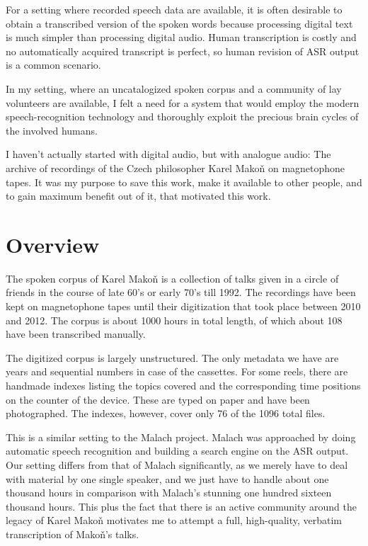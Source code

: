 \documentclass[12pt,a4paper]{report}
\begin{document}
For a setting where recorded speech data are available, it is often desirable to
obtain a transcribed version of the spoken words because processing digital text
is much simpler than processing digital audio. Human transcription is costly and
no automatically acquired transcript is perfect, so human revision of ASR
output is a common scenario.

In my setting, where an uncatalogized spoken corpus and a community of lay
volunteers are available, I felt a need for a system that would employ the
modern speech-recognition technology and thoroughly exploit the precious brain
cycles of the involved humans.

I haven't actually started with digital audio, but with analogue audio: The
archive of recordings of the Czech philosopher Karel Makoň on magnetophone
tapes. It was my purpose to save this work, make it available to other people,
and to gain maximum benefit out of it, that motivated this work.

\section{Overview}

The spoken corpus of Karel Mako\v{n} is a collection of talks given in a circle
of friends in the course of late 60's or early 70's till 1992. The recordings
have been kept on magnetophone tapes until their digitization that took place
between 2010 and 2012. The corpus is
about 1000 hours in total length, of which about 108 have been transcribed
manually.

The digitized corpus is largely unstructured. The only metadata we have are
years and sequential numbers in case of the cassettes. For some reels, there are
handmade indexes listing the topics covered and the corresponding time positions on the
counter of the device. These are typed on paper and have been photographed. The
indexes, however, cover only 76 of the 1096 total files.

This is a similar setting to the Malach\cite{psutka2005automatic} project. Malach was
approached by doing automatic speech recognition and building a search engine on
the ASR output. Our setting differs from that of Malach significantly, as we
merely have to deal with material by one single speaker, and we just have to handle about one thousand hours
in comparison with Malach's stunning one hundred sixteen thousand hours. This
plus the fact that there is an active community around the legacy of Karel
Mako\v{n} motivates me to attempt a full, high-quality, verbatim transcription
of Mako\v{n}'s talks.
\end{document}
